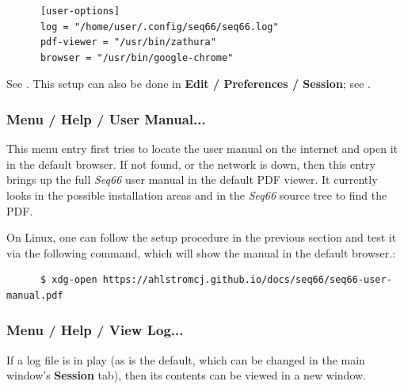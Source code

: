    \begin{verbatim}
      [user-options]
      log = "/home/user/.config/seq66/seq66.log"
      pdf-viewer = "/usr/bin/zathura"
      browser = "/usr/bin/google-chrome"
   \end{verbatim}

   See .
   This setup can also be done in
   \textbf{Edit / Preferences / Session}; see
   .

\subsubsection{Menu / Help / User Manual...}
\label{subsubsec:menu_help_user_manual}

   This menu entry first tries to locate the user manual on the internet and
   open it in the default browser. If not found, or the network is down,
   then this entry brings up the full \textsl{Seq66} user manual in the default
   PDF viewer.  It currently looks in the possible installation areas and in
   the \textsl{Seq66} source tree to find the PDF.

   On Linux, one can follow the setup procedure in the previous section and
   test it via the following command, which will show the manual in the default
   browser.:

   \begin{verbatim}
      $ xdg-open https://ahlstromcj.github.io/docs/seq66/seq66-user-manual.pdf
   \end{verbatim}

\subsubsection{Menu / Help / View Log...}
\label{subsubsec:menu_help_view_log}


   If a log file is in play (as is the default, which can be changed
   in the main window's \textbf{Session} tab), then its contents can
   be viewed in a new window.

